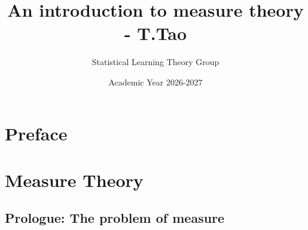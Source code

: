 \documentclass[12pt, oneside]{book}
\title{An introduction to measure theory - T.Tao}
\author{Statistical Learning Theory Group}
\date{Academic Year 2026-2027}
\numberwithin{equation}{chapter}
\begin{document}
\maketitle
\tableofcontents

\vspace{.25in}


\chapter*{Preface}



\chapter{Measure Theory}
\section{Prologue: The problem of measure}











\end{document}
